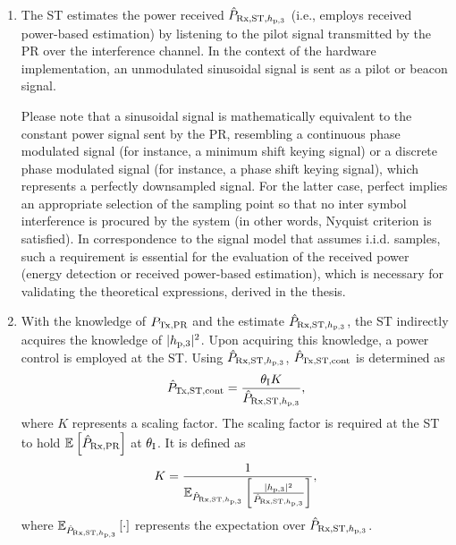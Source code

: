 \begin{enumerate}
	\item The ST estimates the power received $\hat{P}_{\text{Rx,ST,$h_{\text{p,3}}$}}$ (i.e., employs received power-based estimation) by listening to the pilot signal transmitted by the PR over the interference channel. In the context of the hardware implementation, an unmodulated sinusoidal signal is sent as a pilot or beacon signal. 

Please note that a sinusoidal signal is mathematically equivalent to the constant power signal sent by the PR, resembling a continuous phase modulated signal (for instance, a minimum shift keying signal) or a discrete phase modulated signal (for instance, a phase shift keying signal), which represents a perfectly downsampled signal. For the latter case, perfect implies an appropriate selection of the sampling point so that no inter symbol interference is procured by the system (in other words, Nyquist criterion is satisfied). In correspondence to the signal model that assumes i.i.d. samples, such a requirement is essential for the evaluation of the received power (energy detection or received power-based estimation), which is necessary for validating the theoretical expressions, derived in the thesis.
	\item With the knowledge of $P_{\text{Tx,PR}}$ and the estimate $\hat{P}_{\text{Rx,ST,$h_{\text{p,3}}$}}$, the ST indirectly acquires the knowledge of $|h_{\text{p,3}}|^2$. 
	Upon acquiring this knowledge, a power control is employed at the ST. Using $\hat{P}_{\text{Rx,ST,$h_{\text{p,3}}$}}$, $\hat{P}_{\text{Tx,ST,cont}}$ is determined as 
\begin{align}
\hat{P}_{\text{Tx,ST,cont}} = \frac{\theta_{\text{I}} K}{\hat{P}_{\text{Rx,ST,$h_{\text{p,3}}$}}}, \label{eq_HVD:preg} 
\end{align}
where $K$ represents a scaling factor. The scaling factor is required at the ST to hold ${\mathbb E}_{}\left[ \hat{P}_{\text{Rx,PR}} \right]$ at $\theta_{\text{I}}$. It is defined as
\begin{align}
K = \frac{1}{ {\mathbb E}_{\hat{P}_{\text{Rx,ST,$h_{\text{p,3}}$}}}\left[ \frac{|h_{\text{p,3}}|^2}{\hat{P}_{\text{Rx,ST,$h_{\text{p,3}}$}}} \right]}, \label{eq_HVD:sca} 
\end{align}
where ${\mathbb E}_{\hat{P}_{\text{Rx,ST,$h_{\text{p,3}}$}}}\left[ \cdot \right]$ represents the expectation over $\hat{P}_{\text{Rx,ST,$h_{\text{p,3}}$}}$.

\end{enumerate}
